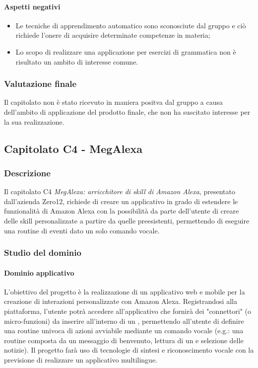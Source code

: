 	\paragraph{Aspetti negativi} 
	\begin{itemize}
		\item {Le tecniche di apprendimento automatico sono sconosciute dal gruppo e ciò richiede l'onere di acquisire determinate competenze in materia;}
		\item {Lo scopo di realizzare una applicazione per esercizi di grammatica non è risultato un ambito di interesse comune.}
	\end{itemize} 
	\subsubsection{Valutazione finale}
	Il capitolato non è stato ricevuto in maniera positva dal gruppo a causa dell'ambito di applicazione del prodotto finale, che non ha suscitato interesse per la sua realizzazione.
	
\subsection{Capitolato C4 - MegAlexa}
\subsubsection{Descrizione}    
Il capitolato C4 \emph{MegAlexa: arricchitore di skill di Amazon Alexa}, presentato dall'azienda Zero12, richiede di creare un applicativo in grado di estendere le funzionalità di Amazon Alexa con la possibilità da parte dell'utente di creare delle skill personalizzate a partire da quelle preesistenti, permettendo di eseguire una routine di eventi dato un solo comando vocale.
\subsubsection{Studio del dominio}

\paragraph{Dominio applicativo} \Spazio
L'obiettivo del progetto è la realizzazione di un applicativo web e mobile per la creazione di interazioni personalizzate con Amazon Alexa. Registrandosi alla piattaforma, l'utente potrà accedere all'applicativo che fornirà dei "connettori" (o micro-funzioni) da inserire all'interno di un , permettendo all'utente di definire una routine univoca di azioni avviabile mediante un comando vocale (e.g.: una routine composta da un messaggio di benvenuto, lettura di un  e selezione delle notizie). Il progetto farà uso di tecnologie di sintesi e riconoscimento vocale con la previsione di realizzare un applicativo multilingue.
